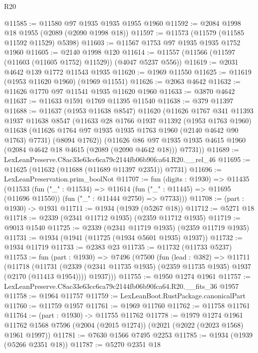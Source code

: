 \begin{lexlean}{R20}
\begin{coremodule}
@11585 := @11580 @97 @1935 @1935 @1955 @1960
@11592 := @2084 @1998 @18 @1955 (@2089 (@2090 @1998 @18))
@11597 := @11573 (@11579 (@11585 @11592 @11529) @5398)
@11603 := @11567 @1753 @97 @1935 @1935 @1752 @1960
@11605 := @2140 @1998 @120
@11614 := @11557 (@11566 (@11597 (@11603 (@11605 @1752) @11529)) (@4047 @5237 @556))
@11619 := @2031 @4642 @139 @1772 @11543 @1935
@11620 := @1969 @11550
@11625 := @11619 (@1953 @11620 @1960) (@1969 @11551)
@11626 := @2063 @4642
@11632 := @11626 @1770 @97 @11541 @1935 @11620 @1960
@11633 := @3870 @4642
@11637 := @11633 @1591 @1769 @11395 @11540
@11638 := @379 @11397
@11688 := @11637
    (@1953 @11638 @8547)
    @11620
    (@11626
      @1767
      @341
      @11393
      @1937
      @11638
      @8547
      (@11633
        @28
        @1766
        @1937
        @11392
        (@1953 @1763 @1960)
        @11638
        (@11626 @1764 @97 @1935 @1935 @1763 @1960 (@2140 @4642 @90 @1763) @7731)
        (@8094 @1762))
      (@11626
        @86
        @97
        @1935
        @1935
        @4615
        @1960
        (@2084 @4642 @18 @4615 (@2089 (@2090 @4642 @18)))
        @7731))
@11689 := LexLeanPreserve.C8ac33e63cc6ca79c2144fb06b90fca64.R20.__rel_46
@11695 := @11625 (@11632 (@11688 (@11689 @11397 @2351)) @7731)
@11696 := LexLeanPreservation.prim_boolNot
@11707 := fun (digits : @1930) =>
  @11435
    (@11533
      (fun ("_" : @11534) =>
      @11614 (fun ("_" : @11445) => @11695 (@11696 @11550)) (fun ("_" : @11444 @2750) => @7733)))
@11708 := (part : @1930) -> @1931
@11711 := @1934 (@1939 (@5267 @18))
@11712 := @5271 @18
@11718 := @2339 (@2341 @11712 @1935) (@2359 @11712 @1935)
@11719 := @9013 @1540
@11725 := @2339 (@2341 @11719 @1935) (@2359 @11719 @1935)
@11731 := @1934 (@1941 (@11725 (@1934 @5601 @1935) @1937))
@11732 := @1934 @11719
@11733 := @2383 @23
@11735 := @11732 (@11733 @5237)
@11753 := fun (part : @1930) =>
  @7496
    (@7500
      (fun (lead : @382) =>
      @11711
        (@11718
          (@11731 (@2339 (@2341 @11735 @1935) (@2359 @11735 @1935) @1937 (@2170 (@11413 @1954))))
          @1937)))
@11755 := @1950 @1274 @1961
@11757 := LexLeanPreserve.C8ac33e63cc6ca79c2144fb06b90fca64.R20.__fits_36 @1957
@11758 := @1964 @11757
@11759 := LexLeanBoot.RustPackage.canonicalPart
@11760 := @11759 @1957
@11761 := @1969 @11760
@11762 := @11758 @11761
@11764 := (part : @1930) -> @11755 @11762
@11778 := @1979
    @1274
    @1961
    @11762
    @1568
    @7596
    (@2004 (@2015 @1274))
    (@2021 (@2022 (@2023 @1568) @1961 @1997))
@11781 := @7630 @1566 @7495 @2253
@11785 := @1934 (@1939 (@5266 @2351 @18))
@11787 := @5270 @2351 @18

\end{coremodule}
\end{lexlean}
